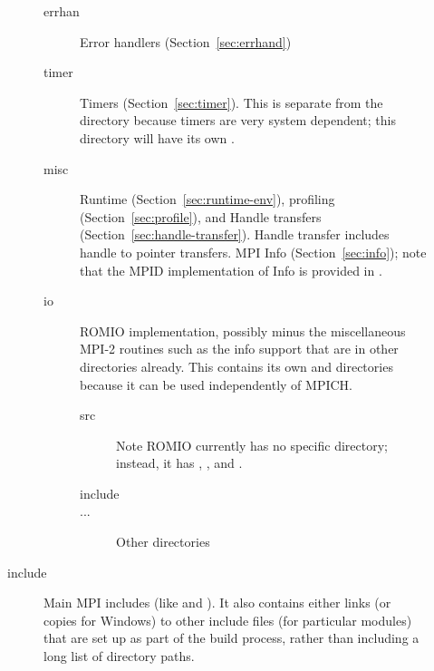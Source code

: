 \documentclass{article}
\begin{document}
\begin{description}
\begin{description}
\begin{description}
    \item[errhan]Error handlers (Section~\ref{sec:errhand})
    \item[timer]Timers (Section~\ref{sec:timer}).  This is separate from the
       directory because timers are very system dependent; this
      directory will have its own .
    \item[misc]Runtime (Section~\ref{sec:runtime-env}), profiling
      (Section~\ref{sec:profile}), and Handle transfers
      (Section~\ref{sec:handle-transfer}).  Handle transfer includes handle to
      pointer transfers. MPI Info (Section~\ref{sec:info}); note that
      the MPID implementation of Info is provided in .
    \item[io]ROMIO implementation, possibly minus the miscellaneous MPI-2
      routines such as the info support that are in other directories already.
      This contains its own  and  directories
      because it can be used independently of MPICH.
      \begin{description}
      \item[src]Note ROMIO currently has no specific  directory;
        instead, it has , , and .
      \item[include]
      \item[...]Other directories
      \end{description}
    \end{description}
\item[include]Main MPI includes (like  and ).  
  It also contains either links (or copies for Windows) to 
  other include files (for particular modules) that are set up as part of
  the build process, rather than including a long list of directory paths.

\end{description}
\end{description}
\end{document}
